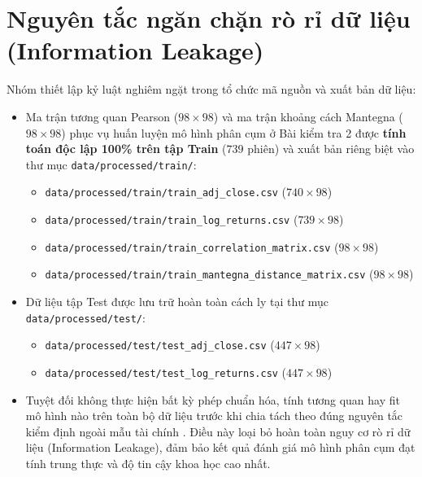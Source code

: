 \documentclass[12pt,a4paper,oneside,openany]{report}
\begin{document}
\section{Nguyên tắc ngăn chặn rò rỉ dữ liệu (Information Leakage)}
Nhóm thiết lập kỷ luật nghiêm ngặt trong tổ chức mã nguồn và xuất bản dữ liệu:
\begin{itemize}
  \item Ma trận tương quan Pearson ($98 \times 98$) và ma trận khoảng cách Mantegna ($98 \times 98$) phục vụ huấn luyện mô hình phân cụm ở Bài kiểm tra 2 được \textbf{tính toán độc lập 100\% trên tập Train} ($739$ phiên) và xuất bản riêng biệt vào thư mục \texttt{data/processed/train/}:
  \begin{itemize}
    \item \texttt{data/processed/train/train\_adj\_close.csv} ($740 \times 98$)
    \item \texttt{data/processed/train/train\_log\_returns.csv} ($739 \times 98$)
    \item \texttt{data/processed/train/train\_correlation\_matrix.csv} ($98 \times 98$)
    \item \texttt{data/processed/train/train\_mantegna\_distance\_matrix.csv} ($98 \times 98$)
  \end{itemize}
  \item Dữ liệu tập Test được lưu trữ hoàn toàn cách ly tại thư mục \texttt{data/processed/test/}:
  \begin{itemize}
    \item \texttt{data/processed/test/test\_adj\_close.csv} ($447 \times 98$)
    \item \texttt{data/processed/test/test\_log\_returns.csv} ($447 \times 98$)
  \end{itemize}
  \item Tuyệt đối không thực hiện bất kỳ phép chuẩn hóa, tính tương quan hay fit mô hình nào trên toàn bộ dữ liệu trước khi chia tách theo đúng nguyên tắc kiểm định ngoài mẫu tài chính \cite{lopezdeprado2018}. Điều này loại bỏ hoàn toàn nguy cơ rò rỉ dữ liệu (Information Leakage), đảm bảo kết quả đánh giá mô hình phân cụm đạt tính trung thực và độ tin cậy khoa học cao nhất.
\end{itemize}


\end{document}
